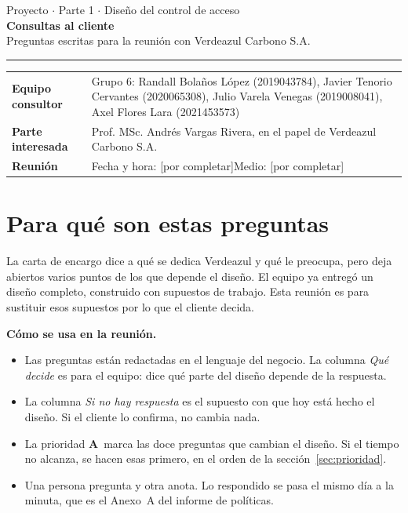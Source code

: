\documentclass[11pt,letterpaper]{article}
\newcommand{\numgrupo}{6}
\newcommand{\porllenar}{\textcolor{pend}{\sffamily\small[por completar]}}
\newcommand{\pri}{\textcolor{vz}{\sffamily\bfseries A}}      %
\begin{document}
{\sffamily\large\color{gris} Proyecto $\cdot$ Parte 1 $\cdot$ Diseño del control de acceso}\\[0.25cm]
{\sffamily\bfseries\fontsize{22}{26}\selectfont Consultas al cliente}\\[0.15cm]
{\sffamily\large Preguntas escritas para la reunión con Verdeazul Carbono S.A.}\\[0.2cm]
{\color{vz}\rule{\textwidth}{1.4pt}}

\vspace{0.2cm}
\begin{tabularx}{\textwidth}{@{}L{3.6cm} Y@{}}
\textbf{Equipo consultor} & Grupo \numgrupo: Randall Bolaños López (2019043784), Javier Tenorio Cervantes (2020065308), Julio Varela Venegas (2019008041), Axel Flores Lara (2021453573) \\
\textbf{Parte interesada} & Prof. MSc. Andrés Vargas Rivera, en el papel de Verdeazul Carbono S.A. \\
\textbf{Reunión} & Fecha y hora: \porllenar \quad Medio: \porllenar \\
\end{tabularx}

\section{Para qué son estas preguntas}

La carta de encargo dice a qué se dedica Verdeazul y qué le preocupa, pero deja abiertos varios puntos
de los que depende el diseño. El equipo ya entregó un diseño completo, construido con supuestos de
trabajo. Esta reunión es para sustituir esos supuestos por lo que el cliente decida.

\textbf{Cómo se usa en la reunión.}

\begin{itemize}
\item Las preguntas están redactadas en el lenguaje del negocio. La columna \emph{Qué decide} es para el
      equipo: dice qué parte del diseño depende de la respuesta.
\item La columna \emph{Si no hay respuesta} es el supuesto con que hoy está hecho el diseño. Si el
      cliente lo confirma, no cambia nada.
\item La prioridad \pri\ marca las doce preguntas que cambian el diseño. Si el tiempo no alcanza, se
      hacen esas primero, en el orden de la sección~\ref{sec:prioridad}.
\item Una persona pregunta y otra anota. Lo respondido se pasa el mismo día a la minuta, que es el
      Anexo~A del informe de políticas.
\end{itemize}
\end{document}
